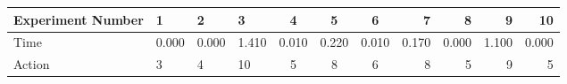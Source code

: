 \documentclass[8pt]{article}
\begin{document}
\begin{landscape}
\begin{tabular}{ | l | l | l | l | c | c | c | r | r | r | r | }
 \hline 
Experiment Number & 1 & 2 & 3 & 4 & 5 & 6 & 7 & 8 & 9 & 10\\ \hline
Time & 0.000 & 0.000 & 1.410 & 0.010 & 0.220 & 0.010 & 0.170 & 0.000 & 1.100 & 0.000\\ \hline
Action & 3 & 4 & 10 & 5 & 8 & 6 & 8 & 5 & 9 & 5\\ \hline\end{tabular}
\end{landscape}
\end{document}

